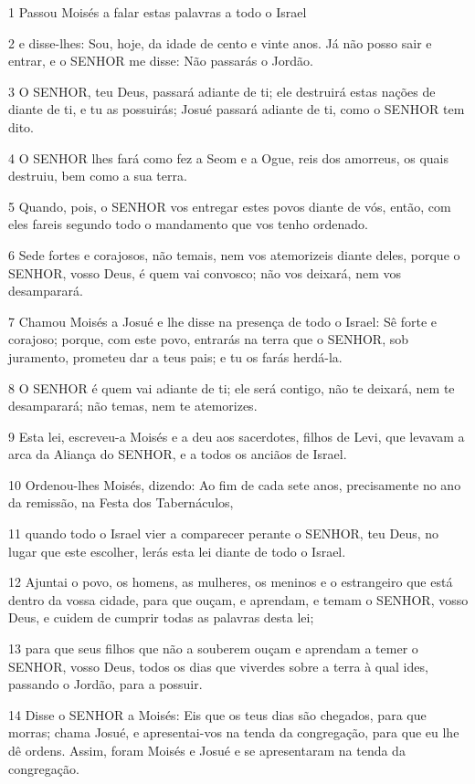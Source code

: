 \par 1 Passou Moisés a falar estas palavras a todo o Israel
\par 2 e disse-lhes: Sou, hoje, da idade de cento e vinte anos. Já não posso sair e entrar, e o SENHOR me disse: Não passarás o Jordão.
\par 3 O SENHOR, teu Deus, passará adiante de ti; ele destruirá estas nações de diante de ti, e tu as possuirás; Josué passará adiante de ti, como o SENHOR tem dito.
\par 4 O SENHOR lhes fará como fez a Seom e a Ogue, reis dos amorreus, os quais destruiu, bem como a sua terra.
\par 5 Quando, pois, o SENHOR vos entregar estes povos diante de vós, então, com eles fareis segundo todo o mandamento que vos tenho ordenado.
\par 6 Sede fortes e corajosos, não temais, nem vos atemorizeis diante deles, porque o SENHOR, vosso Deus, é quem vai convosco; não vos deixará, nem vos desamparará.
\par 7 Chamou Moisés a Josué e lhe disse na presença de todo o Israel: Sê forte e corajoso; porque, com este povo, entrarás na terra que o SENHOR, sob juramento, prometeu dar a teus pais; e tu os farás herdá-la.
\par 8 O SENHOR é quem vai adiante de ti; ele será contigo, não te deixará, nem te desamparará; não temas, nem te atemorizes.
\par 9 Esta lei, escreveu-a Moisés e a deu aos sacerdotes, filhos de Levi, que levavam a arca da Aliança do SENHOR, e a todos os anciãos de Israel.
\par 10 Ordenou-lhes Moisés, dizendo: Ao fim de cada sete anos, precisamente no ano da remissão, na Festa dos Tabernáculos,
\par 11 quando todo o Israel vier a comparecer perante o SENHOR, teu Deus, no lugar que este escolher, lerás esta lei diante de todo o Israel.
\par 12 Ajuntai o povo, os homens, as mulheres, os meninos e o estrangeiro que está dentro da vossa cidade, para que ouçam, e aprendam, e temam o SENHOR, vosso Deus, e cuidem de cumprir todas as palavras desta lei;
\par 13 para que seus filhos que não a souberem ouçam e aprendam a temer o SENHOR, vosso Deus, todos os dias que viverdes sobre a terra à qual ides, passando o Jordão, para a possuir.
\par 14 Disse o SENHOR a Moisés: Eis que os teus dias são chegados, para que morras; chama Josué, e apresentai-vos na tenda da congregação, para que eu lhe dê ordens. Assim, foram Moisés e Josué e se apresentaram na tenda da congregação.
